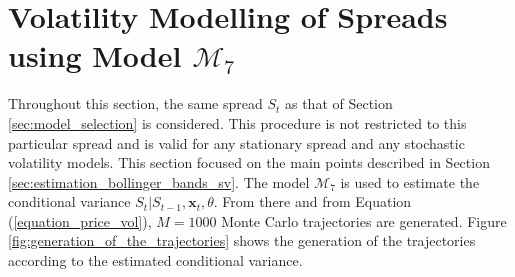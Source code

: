 \documentclass[11pt,a4,twosided,singlespacing,titlepagenumber=on]{scrreprt}
\numberwithin{equation}{chapter} %
\theoremstyle{remark}
\newcommand{\matr}[1]{\mathbf{#1}}
\begin{document}
\section{Volatility Modelling of Spreads using Model $\mathcal{M}_7$}
Throughout this section, the same spread $S_t$ as that of Section \ref{sec:model_selection} is considered. This procedure is not restricted to this particular spread and is valid for any stationary spread and any stochastic volatility models. This section focused on the main points described in Section \ref{sec:estimation_bollinger_bands_sv}. The model $\mathcal{M}_7$ is used to estimate the conditional variance $S_t | S_{t-1}, \matr{x}_t, \theta$. From there and from Equation (\ref{equation_price_vol}), $M = 1000$ Monte Carlo trajectories are generated. Figure \ref{fig:generation_of_the_trajectories} shows the generation of the trajectories according to the estimated conditional variance.
\end{document}
